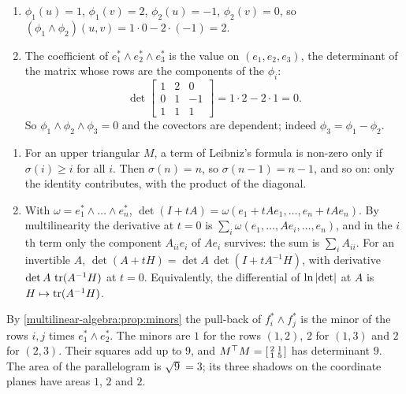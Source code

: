\begin{enumerate}[nosep]
  \item $\phi_1(u) = 1$, $\phi_1(v) = 2$, $\phi_2(u) = -1$,
        $\phi_2(v) = 0$, so
        $(\phi_1\wedge\phi_2)(u, v) = 1\cdot0 - 2\cdot(-1) = 2$.
  \item The coefficient of $e_1^*\wedge e_2^*\wedge e_3^*$ is the value
        on $(e_1, e_2, e_3)$, the determinant of the matrix whose rows
        are the components of the $\phi_i$:
        \[
          \det\begin{bmatrix}1 & 2 & 0\\ 0 & 1 & -1\\ 1 & 1 & 1
          \end{bmatrix} = 1\cdot2 - 2\cdot1 = 0 .
        \]
        So $\phi_1\wedge\phi_2\wedge\phi_3 = 0$ and the covectors are
        dependent; indeed $\phi_3 = \phi_1 - \phi_2$.
\end{enumerate}

\begin{enumerate}[nosep]
  \item For an upper triangular $M$, a term of Leibniz's formula is
        non-zero only if $\sigma(i)\geq i$ for all $i$. Then
        $\sigma(n) = n$, so $\sigma(n - 1) = n - 1$, and so on: only the
        identity contributes, with the product of the diagonal.
  \item With $\omega = e_1^*\wedge\dots\wedge e_n^*$,
        $\det(I + tA) = \omega(e_1 + tAe_1,\dots,e_n + tAe_n)$. By
        multilinearity the derivative at $t = 0$ is
        $\sum_i\omega(e_1,\dots,Ae_i,\dots,e_n)$, and in the $i$th term
        only the component $A_{ii}e_i$ of $Ae_i$ survives: the sum is
        $\sum_iA_{ii}$. For an invertible $A$,
        $\det(A + tH) = \det A\,\det(I + tA^{-1}H)$, with derivative
        $\det A\,\operatorname{tr}(A^{-1}H)$ at $t = 0$. Equivalently, the
        differential of $\ln\left|\det\right|$ at $A$ is
        $H\mapsto\operatorname{tr}(A^{-1}H)$.
\end{enumerate}

By \cref{multilinear-algebra:prop:minors} the pull-back of
$f_i^*\wedge f_j^*$ is the minor of the rows $i, j$ times
$e_1^*\wedge e_2^*$. The minors are $1$ for the rows $(1, 2)$, $2$ for
$(1, 3)$ and $2$ for $(2, 3)$. Their squares add up to $9$, and
$M^\top M = \begin{bsmallmatrix}2 & 1\\ 1 & 5\end{bsmallmatrix}$ has
determinant $9$. The area of the parallelogram is $\sqrt9 = 3$; its
three shadows on the coordinate planes have areas $1$, $2$ and $2$.

